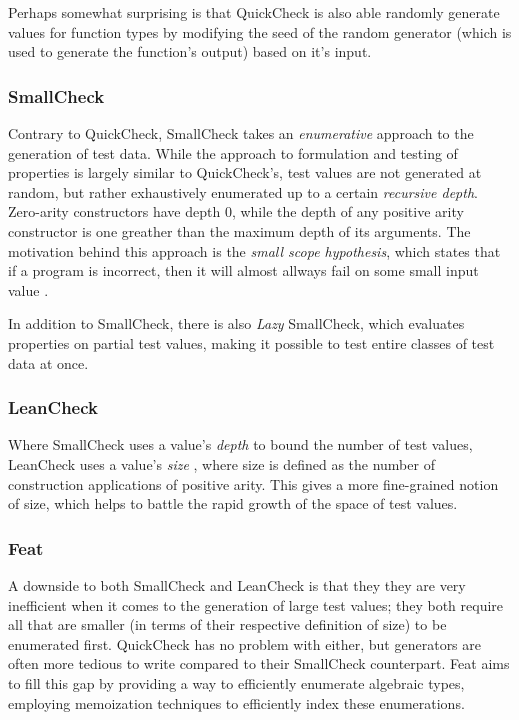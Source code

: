 \documentclass[a4paper,msc,twosized=semi]{uustthesis}
\begin{document}
  Perhaps somewhat surprising is that QuickCheck is also able randomly generate values 
  for function types by modifying the seed of the random generator (which is used to 
  generate the function's output) based on it's input. 

\subsubsection{SmallCheck} 

  Contrary to QuickCheck, SmallCheck \cite{runciman2008smallcheck} takes an \textit
  {enumerative} approach to the generation of test data. While the approach to 
  formulation and testing of properties is largely similar to QuickCheck's, test 
  values are not generated at random, but rather exhaustively enumerated up to a 
  certain \textit{recursive depth}. Zero-arity constructors have depth $0$, while 
  the depth of any positive arity constructor is one greather than the maximum depth 
  of its arguments. The motivation behind this approach is the 
  \textit{small scope hypothesis}, which states that if a program is incorrect, then it 
  will almost allways fail on some small input value \cite{andoni2003evaluating}. 

  In addition to SmallCheck, there is also \textit{Lazy} SmallCheck, which evaluates 
  properties on partial test values, making it possible to test entire classes 
  of test data at once. 

\subsubsection{LeanCheck} 

  Where SmallCheck uses a value's \textit{depth} to bound the number of test values, 
  LeanCheck uses a value's \textit{size} \cite{matela2017tools}, where size is defined 
  as the number of construction applications of positive arity. This gives a more 
  fine-grained notion of size, which helps to battle the rapid growth of the space
  of test values. 

\subsubsection{Feat}

  A downside to both SmallCheck and LeanCheck is that they they are very inefficient when 
  it comes to the generation of large test values; they both require all that are smaller 
  (in terms of their respective definition of size) to be enumerated first. 
  QuickCheck has no problem with either, but generators are often more tedious to write 
  compared to their SmallCheck counterpart. Feat \cite{duregaard2013feat} aims to fill 
  this gap by providing a way to efficiently enumerate algebraic types, employing 
  memoization techniques to efficiently index these enumerations. 
\end{document}
